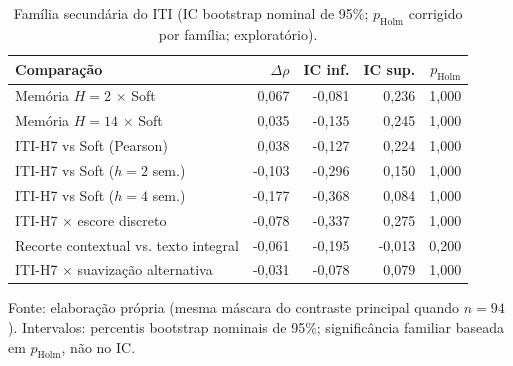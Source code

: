 \begin{table}[htbp]
\centering
\caption{Família secundária do ITI (IC bootstrap nominal de 95\%; $p_{\mathrm{Holm}}$ corrigido por família; exploratório).}
\label{tab:iti-secondary}
\begin{tabularx}{\textwidth}{@{}Lrrrr@{}}
\toprule
Comparação & $\Delta\rho$ & IC inf. & IC sup. & $p_{\mathrm{Holm}}$ \\
\midrule
Memória $H=2$ × Soft & 0,067 & -0,081 & 0,236 & 1,000 \\
Memória $H=14$ × Soft & 0,035 & -0,135 & 0,245 & 1,000 \\
ITI-H7 vs Soft (Pearson) & 0,038 & -0,127 & 0,224 & 1,000 \\
ITI-H7 vs Soft ($h=2$ sem.) & -0,103 & -0,296 & 0,150 & 1,000 \\
ITI-H7 vs Soft ($h=4$ sem.) & -0,177 & -0,368 & 0,084 & 1,000 \\
ITI-H7 × escore discreto & -0,078 & -0,337 & 0,275 & 1,000 \\
Recorte contextual vs. texto integral & -0,061 & -0,195 & -0,013 & 0,200 \\
ITI-H7 × suavização alternativa & -0,031 & -0,078 & 0,079 & 1,000 \\
\bottomrule
\end{tabularx}
\vspace{0.4em}
{\footnotesize Fonte: elaboração própria (mesma máscara do contraste principal quando $n=94$). Intervalos: percentis bootstrap nominais de 95\%; significância familiar baseada em $p_{\mathrm{Holm}}$, não no IC.}
\end{table}
